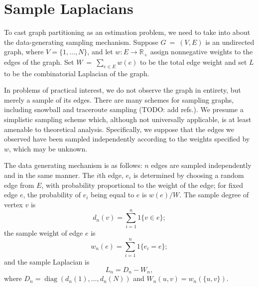 \documentclass{article}
\newcommand{\reals}{\mathbb{R}}
\DeclareMathOperator*{\diag}{diag}
\begin{document}
\section{Sample Laplacians}

To cast graph partitioning as an estimation problem, we need to take
into about the data-generating sampling mechanism.  Suppose
$G~=~(V,E)$ is an undirected graph, where $V = \{ 1, \ldots, N \}$,
and let $w : E \to \reals_+$ assign nonnegative weights to the edges
of the graph.  Set $W~=~\sum_{e \in E} w(e)$ to be the total edge
weight and set $L$ to be the combinatorial Laplacian of the graph.

In problems of practical interest, we do not observe the graph in
entirety, but merely a sample of its edges.  There are many schemes for sampling
graphs, including snowball and traceroute sampling (TODO: add refs.).
We presume a simplistic sampling scheme which, although not
universally applicable, is at least amenable to theoretical analysis.
Specifically, we suppose that the edges we observed have been sampled
independently according to the weights specified by $w$, which may be
unknown.

The data generating mechanism is as follows: $n$ edges are sampled
independently and in the same manner.  The $i$th edge, $e_i$ is determined by
choosing a random edge from $E$, with probability proportional to the
weight of the edge; for fixed edge $e$, the probability of $e_i$ being
equal to $e$ is $w(e) / W$.  The sample degree of vertex $v$ is
\[
  d_n(v) = \sum_{i = 1}^{n} 1\{ v \in e \};
\]
the sample weight of edge $e$ is
\[
  w_n(e) = \sum_{i = 1}^{n} 1\{ e_i = e \};
\]
and the sample Laplacian is
\[
  L_n = D_n - W_n,
\]
where $D_n = \diag(d_n(1), \ldots, d_n(N))$ and
$W_n(u,v) = w_n(\{u,v\})$.
\end{document}
